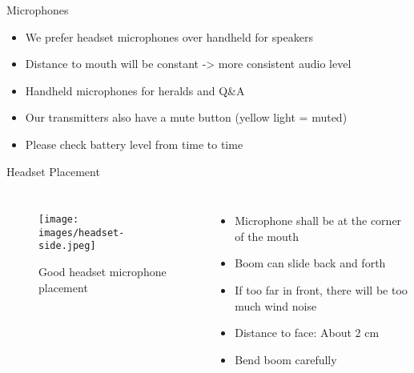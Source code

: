 
\begin{frame}{Microphones}
	\begin{itemize}
		\item We prefer headset microphones over handheld for speakers
		\item Distance to mouth will be constant -> more consistent audio level
		\item Handheld microphones for heralds and Q\&A
		\item Our transmitters also have a mute button (yellow light = muted)
		\item Please check battery level from time to time
	\end{itemize}
\end{frame}

\begin{frame}{Headset Placement}
	\begin{columns}[T,onlytextwidth]
		\begin{figure} 
			\centering
			\texttt{[image: images/headset-side.jpeg]}
			\caption{Good headset microphone placement}
		\end{figure}
		\begin{itemize}
			\item Microphone shall be at the corner of the mouth
			\item Boom can slide back and forth
			\item If too far in front, there will be too much wind noise
			\item Distance to face: About 2 cm
			\item Bend boom carefully
		\end{itemize}
	\end{columns}
\end{frame}
